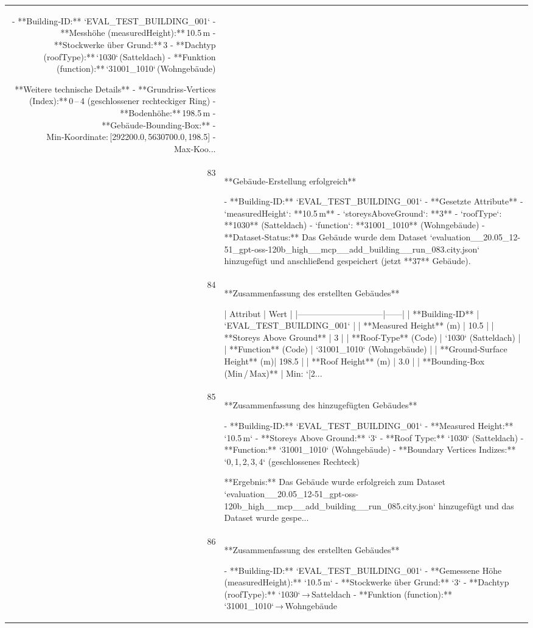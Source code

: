 \documentclass[a4paper,11pt]{article}
\begin{document}
\begin{table}[ht]
\begin{tabular}{r p{12cm}}
- **Building‑ID:** `EVAL\_TEST\_BUILDING\_001`  
- **Messhöhe (measuredHeight):** 10.5 m  
- **Stockwerke über Grund:** 3  
- **Dachtyp (roofType):** `1030` (Satteldach)  
- **Funktion (function):** `31001\_1010` (Wohngebäude)  

**Weitere technische Details**
- **Grundriss‑Vertices (Index):** 0 – 4 (geschlossener rechteckiger Ring)  
- **Bodenhöhe:** 198.5 m  
- **Gebäude‑Bounding‑Box:**  
  - Min‑Koordinate: [292200.0, 5630700.0, 198.5]  
  - Max‑Koo... \\
83 & **Gebäude‑Erstellung erfolgreich**

- **Building‑ID:** `EVAL\_TEST\_BUILDING\_001`  
- **Gesetzte Attribute**  
  - `measuredHeight`: **10.5 m**  
  - `storeysAboveGround`: **3**  
  - `roofType`: **1030** (Satteldach)  
  - `function`: **31001\_1010** (Wohngebäude)  
- **Dataset‑Status:** Das Gebäude wurde dem Dataset `evaluation\_\_20.05\_12-51\_gpt-oss-120b\_high\_\_mcp\_\_add\_building\_\_run\_083.city.json` hinzugefügt und anschließend gespeichert (jetzt **37** Gebäude). \\
84 & **Zusammenfassung des erstellten Gebäudes**

| Attribut                     | Wert |
|------------------------------|------|
| **Building‑ID**              | `EVAL\_TEST\_BUILDING\_001` |
| **Measured Height** (m)      | 10.5 |
| **Storeys Above Ground**     | 3 |
| **Roof‑Type** (Code)         | `1030` (Satteldach) |
| **Function** (Code)          | `31001\_1010` (Wohngebäude) |
| **Ground‑Surface Height** (m)| 198.5 |
| **Roof Height** (m)          | 3.0 |
| **Bounding‑Box (Min / Max)** | Min: `[2... \\
85 & **Zusammenfassung des hinzugefügten Gebäudes**

- **Building-ID:** `EVAL\_TEST\_BUILDING\_001`  
- **Measured Height:** `10.5 m`  
- **Storeys Above Ground:** `3`  
- **Roof Type:** `1030` (Satteldach)  
- **Function:** `31001\_1010` (Wohngebäude)  
- **Boundary Vertices Indizes:** `0, 1, 2, 3, 4` (geschlossenes Rechteck)  

**Ergebnis:** Das Gebäude wurde erfolgreich zum Dataset `evaluation\_\_20.05\_12-51\_gpt-oss-120b\_high\_\_mcp\_\_add\_building\_\_run\_085.city.json` hinzugefügt und das Dataset wurde gespe... \\
86 & **Zusammenfassung des erstellten Gebäudes**

- **Building-ID:** `EVAL\_TEST\_BUILDING\_001`  
- **Gemessene Höhe (measuredHeight):** `10.5 m`  
- **Stockwerke über Grund:** `3`  
- **Dachtyp (roofType):** `1030` → Satteldach  
- **Funktion (function):** `31001\_1010` → Wohngebäude  


\end{tabular}
\end{table}
\end{document}
